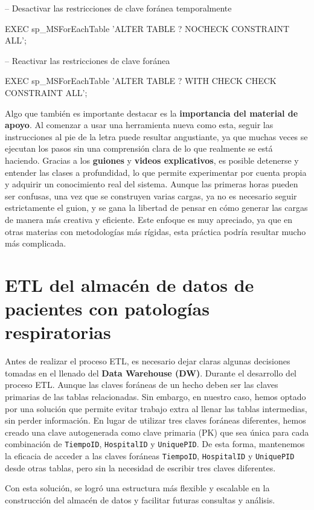 \documentclass[12pt, a4paper, twoside]{article}
\begin{document}
	
	-- Desactivar las restricciones de clave foránea temporalmente
	
	
	EXEC sp\_MSForEachTable 'ALTER TABLE ? NOCHECK CONSTRAINT ALL';
	
	-- Reactivar las restricciones de clave foránea
	
	
	EXEC sp\_MSForEachTable 'ALTER TABLE ? WITH CHECK CHECK CONSTRAINT ALL';
	
	Algo que también es importante destacar es la \textbf{importancia del material de apoyo}. Al comenzar a usar una herramienta nueva como esta, seguir las instrucciones al pie de la letra puede resultar angustiante, ya que muchas veces se ejecutan los pasos sin una comprensión clara de lo que realmente se está haciendo. Gracias a los \textbf{guiones} y \textbf{videos explicativos}, es posible detenerse y entender las clases a profundidad, lo que permite experimentar por cuenta propia y adquirir un conocimiento real del sistema. Aunque las primeras horas pueden ser confusas, una vez que se construyen varias cargas, ya no es necesario seguir estrictamente el guion, y se gana la libertad de pensar en cómo generar las cargas de manera más creativa y eficiente. Este enfoque es muy apreciado, ya que en otras materias con metodologías más rígidas, esta práctica podría resultar mucho más complicada.
	
	
	
	\section{ETL del almacén de datos de pacientes con patologías respiratorias}
	
	Antes de realizar el proceso ETL, es necesario dejar claras algunas decisiones tomadas en el llenado del \textbf{Data Warehouse (DW)}. Durante el desarrollo del proceso ETL. Aunque las claves foráneas de un hecho deben ser las claves primarias de las tablas relacionadas. Sin embargo, en nuestro caso, hemos optado por una solución que permite evitar trabajo extra al llenar las tablas intermedias, sin perder información. En lugar de utilizar tres claves foráneas diferentes, hemos creado una clave autogenerada como clave primaria (PK) que sea única para cada combinación de \texttt{TiempoID}, \texttt{HospitalID} y \texttt{UniquePID}. De esta forma, mantenemos la eficacia de acceder a las claves foráneas \texttt{TiempoID}, \texttt{HospitalID} y \texttt{UniquePID} desde otras tablas, pero sin la necesidad de escribir tres claves diferentes.
	
	Con esta solución, se logró una estructura más flexible y escalable en la construcción del almacén de datos y facilitar futuras consultas y análisis.
\end{document}
